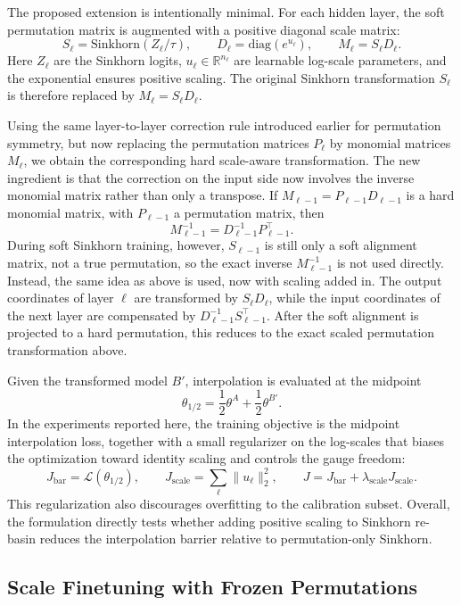 \documentclass[11pt,a4paper]{report}
\begin{document}
The proposed extension is intentionally minimal. For each hidden layer, the soft permutation matrix is augmented with a positive diagonal scale matrix:
\[
S_\ell=\mathrm{Sinkhorn}(Z_\ell/\tau),
\qquad
D_\ell=\mathrm{diag}(e^{u_\ell}),
\qquad
M_\ell=S_\ell D_\ell.
\]
Here \(Z_\ell\) are the Sinkhorn logits, \(u_\ell\in\mathbb{R}^{n_\ell}\) are learnable log-scale parameters, and the exponential ensures positive scaling. The original Sinkhorn transformation \(S_\ell\) is therefore replaced by \(M_\ell=S_\ell D_\ell\).

Using the same layer-to-layer correction rule introduced earlier for permutation symmetry, but now replacing the permutation matrices \(P_\ell\) by monomial matrices \(M_\ell\), we obtain the corresponding hard scale-aware transformation. The new ingredient is that the correction on the input side now involves the inverse monomial matrix rather than only a transpose. If \(M_{\ell-1}=P_{\ell-1}D_{\ell-1}\) is a hard monomial matrix, with \(P_{\ell-1}\) a permutation matrix, then
\[
M_{\ell-1}^{-1}
=
D_{\ell-1}^{-1}P_{\ell-1}^{\top}.
\]
During soft Sinkhorn training, however, \(S_{\ell-1}\) is still only a soft alignment matrix, not a true permutation, so the exact inverse \(M_{\ell-1}^{-1}\) is not used directly. Instead, the same idea as above is used, now with scaling added in. The output coordinates of layer \(\ell\) are transformed by \(S_\ell D_\ell\), while the input coordinates of the next layer are compensated by \(D_{\ell-1}^{-1}S_{\ell-1}^{\top}\). After the soft alignment is projected to a hard permutation, this reduces to the exact scaled permutation transformation above.

Given the transformed model \(B'\), interpolation is evaluated at the midpoint
\[
\theta_{1/2}=\frac{1}{2}\theta^A+\frac{1}{2}\theta^{B'}.
\]
In the experiments reported here, the training objective is the midpoint interpolation loss, together with a small regularizer on the log-scales that biases the optimization toward identity scaling and controls the gauge freedom:
\[
J_{\mathrm{bar}}
=
\mathcal{L}(\theta_{1/2}),
\qquad
J_{\mathrm{scale}}
=
\sum_{\ell}\|u_\ell\|_2^2,
\qquad
J=J_{\mathrm{bar}}+\lambda_{\mathrm{scale}}J_{\mathrm{scale}}.
\]
This regularization also discourages overfitting to the calibration subset. Overall, the formulation directly tests whether adding positive scaling to Sinkhorn re-basin reduces the interpolation barrier relative to permutation-only Sinkhorn.

\subsection{Scale Finetuning with Frozen Permutations}
\end{document}
